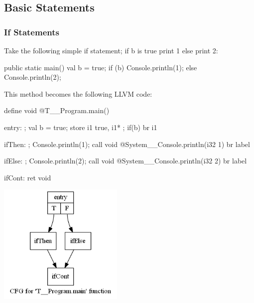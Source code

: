 \documentclass{article}
\begin{document}
\subsection{Basic Statements}
\subsubsection{If Statements}
Take the following simple if statement; if b is true print 1 else print 2:
\begin{sooplisting}
public static main() {
	val b = true;
	if (b)
		Console.println(1);
	else
		Console.println(2);
}
\end{sooplisting}
This method becomes the following LLVM code:\\
\begin{minipage}{0.62\textwidth}
\begin{llvmlisting}
define void @T__Program.main() {
entry:
  ; val b = true;
  store i1 true, i1* %
  ; if(b)
  br i1 %

ifThen:
  ; Console.println(1);
  call void @System__Console.println(i32 1)
  br label %

ifElse:
  ; Console.println(2);
  call void @System__Console.println(i32 2)
  br label %

ifCont:
  ret void
}
\end{llvmlisting}
\end{minipage}
\begin{minipage}{0.38\textwidth}
\includegraphics[width=6cm]{if_cfg_small}
\end{minipage}
\end{document}
